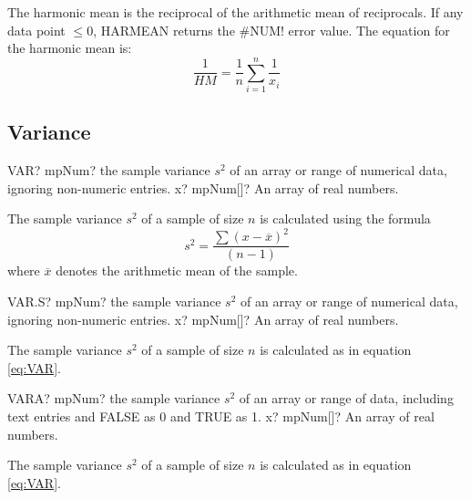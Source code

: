 \vspace{0.3cm}
The harmonic mean is the reciprocal of the arithmetic mean of reciprocals.
If any data point $\leq 0$, HARMEAN returns the \#NUM! error value. 
The equation for the harmonic mean is:
\begin{equation}
	\frac{1}{HM}=\frac{1}{n} \sum_{i=1}^n \frac{1}{x_i}
\end{equation}






\subsection{Variance}


\begin{mpFunctionsExtract}
	\mpWorksheetFunctionOneNotImplemented
	{VAR? mpNum? the sample variance $s^2$ of an array or range of numerical data, ignoring non-numeric entries.}
	{x? mpNum[]? An array of real numbers.}
\end{mpFunctionsExtract}

The sample variance $s^2$ of a sample of size $n$ is calculated using the formula
\begin{equation} \label{eq:VAR}
	s^2 = \frac{\sum (x-\overline{x})^2}{(n-1)} 
\end{equation}
where $\overline{x}$ denotes the arithmetic mean of the sample.



\vspace{0.6cm}
\begin{mpFunctionsExtract}
	\mpWorksheetFunctionOneNotImplemented
	{VAR.S? mpNum? the sample variance $s^2$ of an array or range of numerical data, ignoring non-numeric entries.}
	{x? mpNum[]? An array of real numbers.}
\end{mpFunctionsExtract}

The sample variance $s^2$ of a sample of size $n$ is calculated as in equation \ref{eq:VAR}.



\vspace{0.6cm}
\begin{mpFunctionsExtract}
	\mpWorksheetFunctionOneNotImplemented
	{VARA? mpNum? the sample variance $s^2$ of an array or range of data, including text entries and FALSE as 0 and TRUE as 1.}
	{x? mpNum[]? An array of real numbers.}
\end{mpFunctionsExtract}

The sample variance $s^2$ of a sample of size $n$ is calculated as in equation \ref{eq:VAR}.



